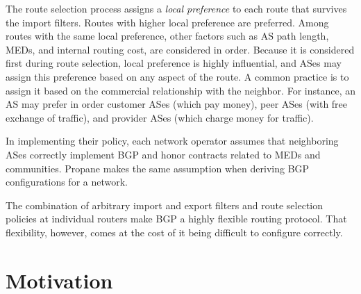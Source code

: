 \documentclass[10pt]{sigalternate052015}
\newcommand{\sysname}{{\small \sf Propane}\xspace}
\begin{document}
The route selection process assigns a {\em local preference} to each
route that survives the import filters. Routes with higher local
preference are preferred. Among routes with the same local preference,
other factors such as AS path length, MEDs, and internal routing cost, are considered in order. Because it is considered first during route selection, local preference is highly influential, and ASes may assign this preference based on any aspect of the route. A common practice is to assign it based on the commercial relationship with the neighbor. For instance, an AS may prefer in order customer ASes (which pay money), peer ASes (with free exchange of traffic), and provider ASes (which charge money for traffic).

In implementing their policy, each network operator assumes that
neighboring ASes correctly implement BGP and honor contracts related
to MEDs and communities. \sysname makes the same assumption when
deriving BGP configurations for a network.

The combination of arbitrary import and export filters and route selection policies at individual routers make BGP a highly flexible routing protocol. That flexibility, however, comes at the cost of it being difficult to configure correctly.




%
%
%
%

\section{Motivation}
\label{sec:motivation}
\end{document}
